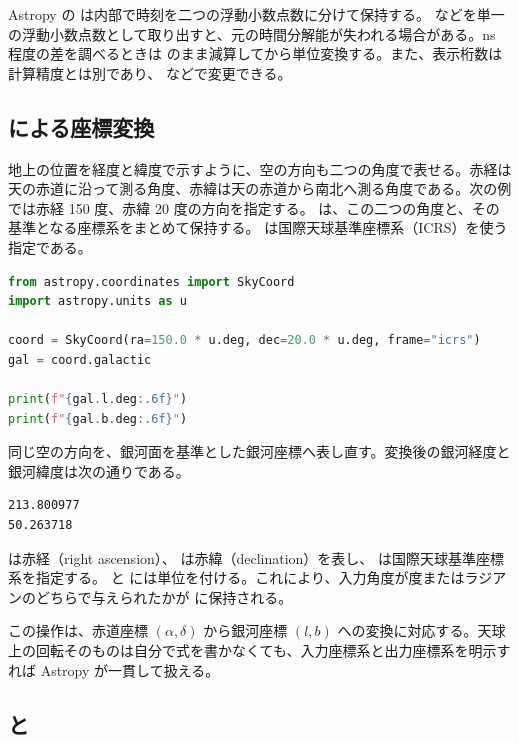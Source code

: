 Astropy の  は内部で時刻を二つの浮動小数点数に分けて保持する。 などを単一の浮動小数点数として取り出すと、元の時間分解能が失われる場合がある。ns 程度の差を調べるときは  のまま減算してから単位変換する。また、表示桁数は計算精度とは別であり、 などで変更できる。

\subsection{ による座標変換}

地上の位置を経度と緯度で示すように、空の方向も二つの角度で表せる。赤経は天の赤道に沿って測る角度、赤緯は天の赤道から南北へ測る角度である。次の例では赤経 150 度、赤緯 20 度の方向を指定する。 は、この二つの角度と、その基準となる座標系をまとめて保持する。 は国際天球基準座標系（ICRS）を使う指定である。

\begin{lstlisting}[language=Python]
from astropy.coordinates import SkyCoord
import astropy.units as u

coord = SkyCoord(ra=150.0 * u.deg, dec=20.0 * u.deg, frame="icrs")
gal = coord.galactic

print(f"{gal.l.deg:.6f}")
print(f"{gal.b.deg:.6f}")
\end{lstlisting}

同じ空の方向を、銀河面を基準とした銀河座標へ表し直す。変換後の銀河経度と銀河緯度は次の通りである。

\begin{lstlisting}[numbers=none, xleftmargin=2\zw]
213.800977
50.263718
\end{lstlisting}

 は赤経（right ascension）、 は赤緯（declination）を表し、 は国際天球基準座標系を指定する。 と  には単位を付ける。これにより、入力角度が度またはラジアンのどちらで与えられたかが  に保持される。

この操作は、赤道座標 \((\alpha, \delta)\) から銀河座標 \((l, b)\) への変換に対応する。天球上の回転そのものは自分で式を書かなくても、入力座標系と出力座標系を明示すれば Astropy が一貫して扱える。

\subsection{ と }

